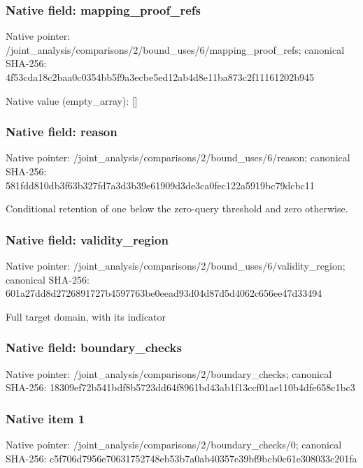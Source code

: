 \documentclass[10pt,a4paper]{article}
\begin{document}
\subsubsection{Native field: mapping\_\allowbreak{}proof\_\allowbreak{}refs}
Native pointer: /joint\_\allowbreak{}analysis/comparisons/2/bound\_\allowbreak{}uses/6/mapping\_\allowbreak{}proof\_\allowbreak{}refs; canonical SHA-256: 4f53cda18c2baa0c0354bb5f9a3ecbe5ed12ab4d8e11ba873c2f11161202b945

Native value (empty\_\allowbreak{}array): []

\subsubsection{Native field: reason}
Native pointer: /joint\_\allowbreak{}analysis/comparisons/2/bound\_\allowbreak{}uses/6/reason; canonical SHA-256: 581fdd810db3f63b327fd7a3d3b39e61909d3de3ca0fec122a5919bc79dcbc11

\begingroup\raggedright\sloppy Conditional retention of one below the zero-query threshold and zero otherwise.\par\endgroup

\subsubsection{Native field: validity\_\allowbreak{}region}
Native pointer: /joint\_\allowbreak{}analysis/comparisons/2/bound\_\allowbreak{}uses/6/validity\_\allowbreak{}region; canonical SHA-256: 601a27dd8d2726891727b4597763be0eead93d04d87d5d4062c656ee47d33494

\begingroup\raggedright\sloppy Full target domain,\allowbreak{} with its indicator\par\endgroup

\subsubsection{Native field: boundary\_\allowbreak{}checks}
Native pointer: /joint\_\allowbreak{}analysis/comparisons/2/boundary\_\allowbreak{}checks; canonical SHA-256: 18309ef72b541bdf8b5723dd64f8961bd43ab1f13ccf01ae110b4dfe658c1bc3

\subsubsection{Native item 1}
Native pointer: /joint\_\allowbreak{}analysis/comparisons/2/boundary\_\allowbreak{}checks/0; canonical SHA-256: c5f706d7956e70631752748eb53b7a0ab40357e39bf9bcb0c61e308033c201fa
\end{document}
